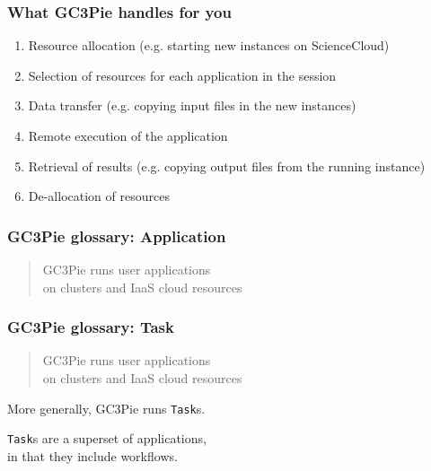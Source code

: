 \documentclass[english,serif,mathserif,usenames,dvipsnames]{beamer}
\begin{document}
\begin{frame}
  \frametitle{What GC3Pie handles for you}

  \begin{enumerate}\small
  \item Resource allocation (e.g. starting new instances on
    ScienceCloud)
  \item Selection of resources for each application in the session
  \item Data transfer (e.g. copying input files in the new instances)
  \item Remote execution of the application
  \item Retrieval of results (e.g. copying output files from the
    running instance)
  \item De-allocation of resources
  \end{enumerate}

\end{frame}



\begin{frame}
  \frametitle{GC3Pie glossary: Application}
  \begin{quote}
    GC3Pie runs \alert<2-3>{user applications}
    \\
    on clusters and IaaS cloud resources
  \end{quote}

\end{frame}



\begin{frame}
  \frametitle{GC3Pie glossary: Task}
  \begin{quote}
    GC3Pie \alert{runs} user applications
    \\
    on clusters and IaaS cloud resources
  \end{quote}

  \+ More generally, GC3Pie runs \texttt{Task}s.

  \+ \texttt{Task}s are a superset of applications,
  \\ in that they include workflows.

  \+ \hyperlink{workflows}{}
\end{frame}
\end{document}
